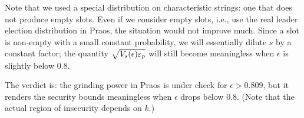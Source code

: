 Note that we used a special distribution on characteristic strings: 
one that does not produce empty slots. 
Even if we consider empty slots, i.e., 
use the real leader election distribution in Praos, 
the situation would not improve much. 
Since a slot is non-empty with a small constant probability, 
we will essentially dilute $s$ by a constant factor; 
the quantity $\sqrt{V_s(\epsilon) \mathsf{\varepsilon}_p}$ will still become meaningless 
when $\epsilon$ is slightly below $0.8$.

The verdict is: the grinding power in Praos is under check for $\epsilon > 0.809$, 
but it renders the security bounds meaningless when $\epsilon$ drops below $0.8$. 
(Note that the actual region of insecurity depends on $k$.)



